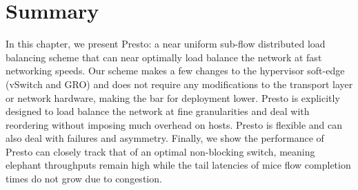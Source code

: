 \section{Summary}
\label{sec:conclusion}
In this chapter, we present Presto: a near uniform sub-flow distributed load balancing scheme
that can near optimally load balance the network at fast networking speeds.
Our scheme makes a few changes to the hypervisor soft-edge (vSwitch and GRO)
and does not require any modifications to the transport layer or network hardware, making
the bar for deployment lower. 
Presto is explicitly designed to load balance the network at fine granularities
and deal with reordering without imposing much overhead on hosts. Presto is flexible and can also
deal with failures and asymmetry. Finally, we show the performance of Presto can closely track
that of an optimal non-blocking switch, meaning elephant throughputs remain high while the tail
latencies of mice flow completion times do not grow due to congestion.
